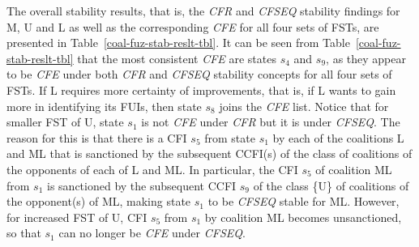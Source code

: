 The overall stability results, that is, the \emph{CFR} and \emph{CFSEQ} stability findings for M, U and L as well as the corresponding \emph{CFE} for all four sets of FSTs, are presented in Table~\ref{coal-fuz-stab-reslt-tbl}. It can be seen from Table~\ref{coal-fuz-stab-reslt-tbl} that the most consistent \emph{CFE} are states $s_4$ and $s_9$, as they appear to be \emph{CFE} under both \emph{CFR} and \emph{CFSEQ} stability concepts for all four sets of FSTs. If L requires more certainty of improvements, that is, if L wants to gain more in identifying its FUIs, then state $s_8$ joins the \emph{CFE} list. Notice that for smaller FST of U, state $s_1$ is not \emph{CFE} under \emph{CFR} but it is under \emph{CFSEQ}. The reason for this is that there is a CFI $s_5$ from state $s_1$ by each of the coalitions L and ML that is sanctioned by the subsequent CCFI(s) of the class of coalitions of the opponents of each of L and ML. In particular, the CFI $s_5$ of coalition ML from $s_1$ is sanctioned by the subsequent CCFI $s_9$ of the class \{U\} of coalitions of the opponent(s) of ML, making state $s_1$ to be \emph{CFSEQ} stable for ML. However, for increased FST of U, CFI $s_5$ from $s_1$ by coalition ML becomes unsanctioned, so that $s_1$ can no longer be \emph{CFE} under \emph{CFSEQ}.

